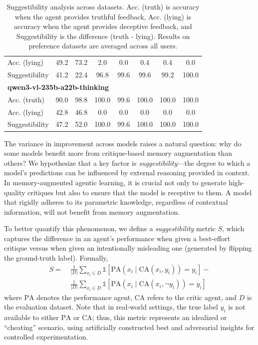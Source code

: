 \begin{table}[t]
\begin{tabular}{lccccccc}
\quad Acc. (lying) & 49.2 & 73.2 & 2.0 & 0.0 & 0.4 & 0.4 & 0.0 \\
\quad Suggestibility & 41.2 & 22.4 & 96.8 & 99.6 & 99.6 & 99.2 & 100.0 \\
\hline
\multicolumn{8}{l}{\textbf{qwen3-vl-235b-a22b-thinking}} \\
\quad Acc. (truth) & 90.0 & 98.8 & 100.0 & 99.6 & 100.0 & 100.0 & 100.0 \\
\quad Acc. (lying) & 42.8 & 46.8 & 0.0 & 0.0 & 0.0 & 0.0 & 0.0 \\
\quad Suggestibility & 47.2 & 52.0 & 100.0 & 99.6 & 100.0 & 100.0 & 100.0 \\
\bottomrule
\end{tabular}
\caption{Suggestibility analysis across datasets. Acc. (truth) is accuracy when the agent provides truthful feedback, Acc. (lying) is accuracy when the agent provides deceptive feedback, and Suggestibility is the difference (truth - lying). Results on preference datasets are averaged across all users.}
\label{tab:suggestibility}
\end{table}

The variance in improvement across models raises a natural question: why do some models benefit more from critique-based memory augmentation than others? We hypothesize that a key factor is \textit{suggestibility}—the degree to which a model's predictions can be influenced by external reasoning provided in context. In memory-augmented agentic learning, it is crucial not only to generate high-quality critiques but also to ensure that the model is receptive to them. A model that rigidly adheres to its parametric knowledge, regardless of contextual information, will not benefit from memory augmentation.

To better quantify this phenomenon, we define a \textit{suggestibility} metric $S$, which captures the difference in an agent’s performance when given a best-effort critique versus when given an intentionally misleading one (generated by flipping the ground-truth label). Formally,
\begin{align*}
    S =\;& 
    \frac{1}{|D|} \sum_{x_i \in D} 
    \mathbb{1} \left[ \text{PA}(x_i \mid \text{CA}(x_i, y_i)) = y_i \right] - \\
    & 
    \frac{1}{|D|} \sum_{x_i \in D} 
    \mathbb{1} \left[ \text{PA}(x_i \mid \text{CA}(x_i, \neg y_i)) = y_i \right]
\end{align*}
where $\text{PA}$ denotes the performance agent, $\text{CA}$ refers to the critic agent, and $D$ is the evaluation dataset. Note that in real-world settings, the true label $y_i$ is not available to either $\text{PA}$ or $\text{CA}$; thus, this metric represents an idealized or “cheating” scenario, using artificially constructed best and adversarial insights for controlled experimentation.


